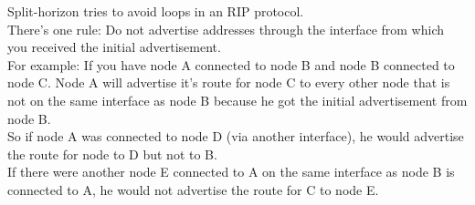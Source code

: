 Split-horizon tries to avoid loops in an RIP protocol. \\
There's one rule: Do not advertise addresses through the interface from which you received the initial advertisement. \\
For example: If you have node A connected to node B and node B connected to node C. Node A will advertise it's route for node C to every other node that is not on the same interface as node B because he got the initial advertisement from node B. \\
So if node A was connected to node D (via another interface), he would advertise the route for node to D but not to B. \\
If there were another node E connected to A on the same interface as node B is connected to A, he would not advertise the route for C to node E.